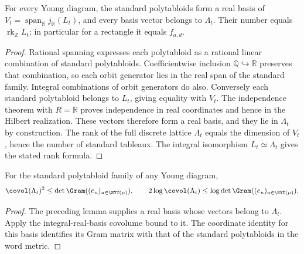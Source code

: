 \begin{lemma}
\label{lem:real-standard-basis}
\leanok
For every Young diagram, the standard polytabloids form a real basis
of $V_t=\operatorname{span}_{\mathbb R}j_{\mathbb R}(L_t)$,
and every basis vector belongs to $\Lambda_t$.
Their number equals $\operatorname{rk}_{\mathbb Z}L_t$;
in particular for a rectangle it equals $f_{a,d}$.
\end{lemma}
\begin{proof}
Rational spanning expresses each polytabloid as a rational linear
combination of standard polytabloids. Coefficientwise inclusion
$\mathbb Q\hookrightarrow\mathbb R$ preserves that combination,
so each orbit generator lies in the real span of the standard family.
Integral combinations of orbit generators do also. Conversely each
standard polytabloid belongs to $L_t$, giving equality with $V_t$.
The independence theorem with $R=\mathbb R$ proves independence in
real coordinates and hence in the Hilbert realization. These vectors
therefore form a real basis, and they lie in $\Lambda_t$ by construction.
The rank of the full discrete lattice $\Lambda_t$ equals the dimension
of $V_t$, hence the number of standard tableaux. The integral
isomorphism $L_t\simeq\Lambda_t$ gives the stated rank formula.
\end{proof}

\begin{lemma}
\label{lem:standard-gram-covolume}
\leanok
For the standard polytabloid family of any Young diagram,
\[
 \covol(\Lambda_t)^2\leq\det\Gram((e_u)_{u\in\SYT(\mu)}),\qquad
 2\log\covol(\Lambda_t)\leq
 \log\det\Gram((e_u)_{u\in\SYT(\mu)}).
\]
\end{lemma}
\begin{proof}
The preceding lemma supplies a real basis whose vectors belong to
$\Lambda_t$. Apply the integral-real-basis covolume bound to it.
The coordinate identity for this basis identifies its Gram matrix
with that of the standard polytabloids in the word metric.
\end{proof}

